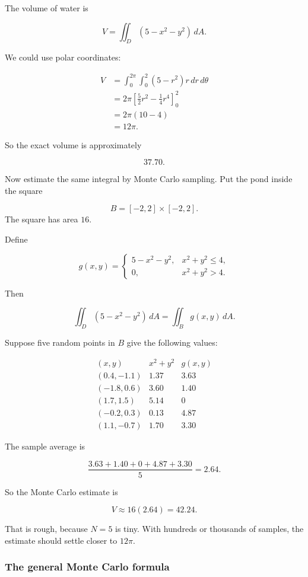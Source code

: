 The volume of water is

\[
    V=\iint_D (5-x^2-y^2)\,dA.
\]

We could use polar coordinates:

\[
\begin{aligned}
V
&=
\int_0^{2\pi}\int_0^2(5-r^2)r\,dr\,d\theta\\
&=
2\pi
\left[
\frac52r^2-\frac14r^4
\right]_0^2\\
&=
2\pi(10-4)\\
&=
12\pi.
\end{aligned}
\]

So the exact volume is approximately

\[
    37.70.
\]

Now estimate the same integral by Monte Carlo sampling.  Put the pond inside the square

\[
    B=[-2,2]\times[-2,2].
\]
The square has area \(16\).

Define

\[
    g(x,y)=
    \begin{cases}
    5-x^2-y^2, & x^2+y^2\le4,\\
    0, & x^2+y^2>4.
    \end{cases}
\]

Then

\[
    \iint_D(5-x^2-y^2)\,dA
    =
    \iint_B g(x,y)\,dA.
\]

Suppose five random points in \(B\) give the following values:

\[
\begin{array}{c|c|c}
(x,y) & x^2+y^2 & g(x,y) \\ \hline
(0.4,-1.1) & 1.37 & 3.63\\
(-1.8,0.6) & 3.60 & 1.40\\
(1.7,1.5) & 5.14 & 0\\
(-0.2,0.3) & 0.13 & 4.87\\
(1.1,-0.7) & 1.70 & 3.30
\end{array}
\]

The sample average is

\[
    \frac{3.63+1.40+0+4.87+3.30}{5}=2.64.
\]

So the Monte Carlo estimate is

\[
\boxed{
    V\approx 16(2.64)=42.24.
}
\]

That is rough, because \(N=5\) is tiny.  With hundreds or thousands of samples, the
estimate should settle closer to \(12\pi\).

\subsubsection*{The general Monte Carlo formula}


